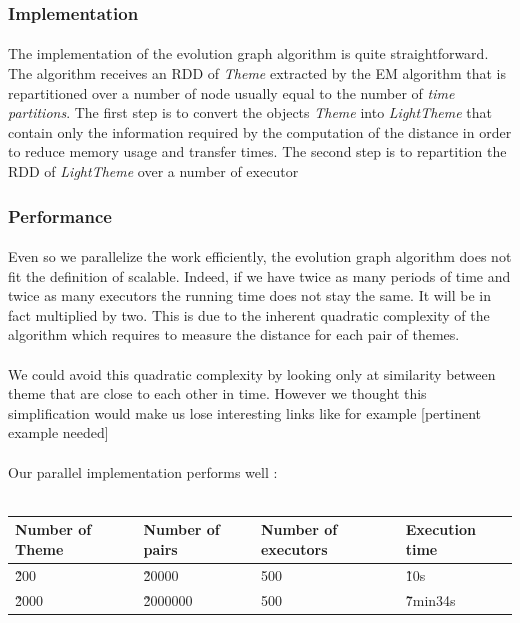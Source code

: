 \subsubsection{Implementation}
\label{sec:EvoGraphImplementation}
\paragraph{}
The implementation of the evolution graph algorithm is quite straightforward. The algorithm receives an RDD of \emph{Theme} extracted by the EM algorithm that is repartitioned over a number of node usually equal to the number of \emph{time partitions}. The first step is to convert the objects \emph{Theme} into \emph{LightTheme} that contain only the information required by the computation of the distance in order to reduce memory usage and transfer times. The second step is to repartition the RDD of \emph{LightTheme} over a number of executor 

\subsubsection{Performance}
\label{sec:EvoGraphPerformance}
\paragraph{}
Even so we parallelize the work efficiently, the evolution graph algorithm does not fit the definition of scalable. Indeed, if we have twice as many periods of time and twice as many executors the running time does not stay the same. It will be in fact multiplied by two. This is due to the inherent quadratic complexity of the algorithm which requires to measure the distance for each pair of themes.

\paragraph{}
We could avoid this quadratic complexity by looking only at similarity between theme that are close to each other in time. However we thought this simplification would make us lose interesting links like for example [pertinent example needed]

\paragraph{}
Our parallel implementation performs well :\\
~\newline
\begin{tabular}{l|l|l|l}
Number of Theme & Number of pairs & Number of executors & Execution time \\ \hline
\~ 200 & \~ 20000 & 500 & \~ 10s \\
\~ 2000 & \~ 2000000 & 500 & \~ 7min34s \\
\end{tabular}



